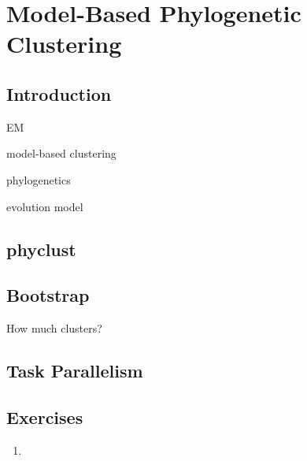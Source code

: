 
\chapter{Model-Based Phylogenetic Clustering}
\label{chp:phyclust}


\section{Introduction}
EM

model-based clustering

phylogenetics

evolution model




\section{phyclust}




\section{Bootstrap}

How much clusters?




\section{Task Parallelism}




\section{Exercises}
\label{sec:phyclust_exercise}

\begin{enumerate}[label=\thechapter-\arabic*]

\item


\end{enumerate}


